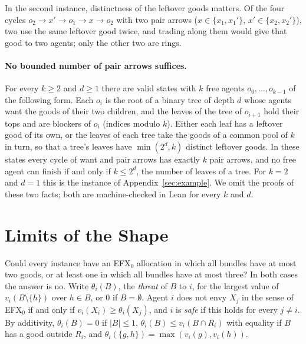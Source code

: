 \documentclass[runningheads,11pt]{llncs}
\newcommand{\efxz}{\texorpdfstring{\mbox{EFX$_0$}}{EFX0}}
\begin{document}
\noindent In the second instance, distinctness of the leftover goods matters. Of the four cycles $o_2\to x'\to o_1\to x\to o_2$ with two pair arrows ($x\in\{x_1,x_1'\}$, $x'\in\{x_2,x_2'\}$), two use the same leftover good twice, and trading along them would give that good to two agents; only the other two are rings.

\paragraph{No bounded number of pair arrows suffices.} For every $k\ge2$ and $d\ge1$ there are valid states with $k$ free agents $o_0,\dots,o_{k-1}$ of the following form. Each $o_i$ is the root of a binary tree of depth $d$ whose agents want the goods of their two children, and the leaves of the tree of $o_{i+1}$ hold their tops and are blockers of $o_i$ (indices modulo $k$). Either each leaf has a leftover good of its own, or the leaves of each tree take the goods of a common pool of $k$ in turn, so that a tree's leaves have $\min(2^d,k)$ distinct leftover goods. In these states every cycle of want and pair arrows has exactly $k$ pair arrows, and no free agent can finish if and only if $k\le2^d$, the number of leaves of a tree. For $k=2$ and $d=1$ this is the instance of Appendix~\ref{sec:example}. We omit the proofs of these two facts; both are machine-checked in Lean for every $k$ and $d$.

\section{Limits of the Shape}\label{app:limits}

Could every instance have an \efxz{} allocation in which all bundles have at most two goods, or at least one in which all bundles have at most three? In both cases the answer is no. Write $\theta_i(B)$, the \emph{threat} of $B$ to $i$, for the largest value of $v_i(B\setminus\{h\})$ over $h\in B$, or $0$ if $B=\emptyset$. Agent $i$ does not envy $X_j$ in the sense of \efxz{} if and only if $v_i(X_i)\ge\theta_i(X_j)$, and $i$ is \emph{safe} if this holds for every $j\ne i$. By additivity, $\theta_i(B)=0$ if $|B|\le1$, $\theta_i(B)\le v_i(B\cap R_i)$ with equality if $B$ has a good outside $R_i$, and $\theta_i(\{g,h\})=\max(v_i(g),v_i(h))$.
\end{document}
